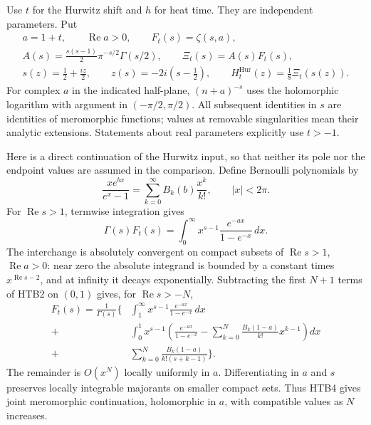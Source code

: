 \documentclass[11pt]{article}
\theoremstyle{definition}
\begin{document}
Use $t$ for the Hurwitz shift and $h$ for heat time. They are independent
parameters. Put
\begin{equation}\tag{HTB1}
\begin{gathered}
 a=1+t,\qquad \operatorname{Re}a>0,\qquad
 F_t(s)=\zeta(s,a),\\
 A(s)=\frac{s(s-1)}2\pi^{-s/2}\Gamma(s/2),\qquad
 \Xi_t(s)=A(s)F_t(s),\\
 s(z)=\frac12+\frac{iz}{2},\qquad
 z(s)=-2i\left(s-\frac12\right),\qquad
 H_t^{\mathrm{Hur}}(z)=\frac18\Xi_t(s(z)).
\end{gathered}
\end{equation}
For complex $a$ in the indicated half-plane, $(n+a)^{-s}$ uses the
holomorphic logarithm with argument in $(-\pi/2,\pi/2)$. All subsequent
identities in $s$ are identities of meromorphic functions; values at
removable singularities mean their analytic extensions. Statements about
real parameters explicitly use $t>-1$.

Here is a direct continuation of the Hurwitz input, so that neither its
pole nor the endpoint values are assumed in the comparison. Define
Bernoulli polynomials by
\begin{equation}\tag{HTB2}
 \frac{x e^{b x}}{e^x-1}
 =\sum_{k=0}^{\infty}B_k(b)\frac{x^k}{k!},\qquad |x|<2\pi.
\end{equation}
For $\operatorname{Re}s>1$, termwise integration gives
\begin{equation}\tag{HTB3}
 \Gamma(s)F_t(s)
 =\int_0^{\infty}x^{s-1}\frac{e^{-a x}}{1-e^{-x}}\,dx.
\end{equation}
The interchange is absolutely convergent on compact subsets of
$\operatorname{Re}s>1$, $\operatorname{Re}a>0$: near zero the absolute
integrand is bounded by a constant times $x^{\operatorname{Re}s-2}$,
and at infinity it decays exponentially. Subtracting the first $N+1$
terms of HTB2 on $(0,1)$ gives, for $\operatorname{Re}s>-N$,
\begin{equation}\tag{HTB4}
\begin{split}
 F_t(s)=\frac1{\Gamma(s)}\bigg\{
 &\int_1^{\infty}x^{s-1}\frac{e^{-a x}}{1-e^{-x}}\,dx\\
 +&\int_0^1x^{s-1}
 \left(\frac{e^{-a x}}{1-e^{-x}}
       -\sum_{k=0}^{N}\frac{B_k(1-a)}{k!}x^{k-1}\right)dx\\
 +&\sum_{k=0}^{N}\frac{B_k(1-a)}{k!(s+k-1)}\bigg\}.
\end{split}
\end{equation}
The remainder is $O(x^N)$ locally uniformly in $a$. Differentiating in
$a$ and $s$ preserves locally integrable majorants on smaller compact
sets. Thus HTB4 gives joint meromorphic continuation, holomorphic in
$a$, with compatible values as $N$ increases.
\end{document}
